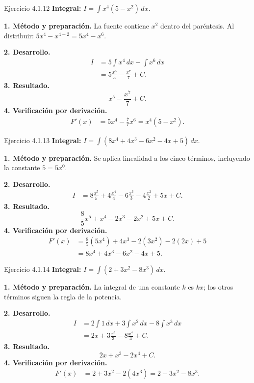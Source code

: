 \begin{examplebox}{Ejercicio 4.1.12}
\textbf{Integral:} $\displaystyle I=\int x^4(5-x^2)\,dx$.

\textbf{1. Método y preparación.} La fuente contiene $x^2$ dentro del paréntesis. Al distribuir: $5x^4-x^{4+2}=5x^4-x^6$.

\textbf{2. Desarrollo.}
\begin{align*}
I&=5\int x^4\,dx-\int x^6\,dx\\&=5\frac{x^5}{5}-\frac{x^7}{7}+C.
\end{align*}
\textbf{3. Resultado.}
\[
x^5-\frac{x^7}{7}+C.
\]
\textbf{4. Verificación por derivación.}
\begin{align*}
F'(x)&=5x^4-\frac77x^6=x^4(5-x^2).
\end{align*}
\end{examplebox}

\begin{examplebox}{Ejercicio 4.1.13}
\textbf{Integral:} $\displaystyle I=\int (8x^4+4x^3-6x^2-4x+5)\,dx$.

\textbf{1. Método y preparación.} Se aplica linealidad a los cinco términos, incluyendo la constante $5=5x^0$.

\textbf{2. Desarrollo.}
\begin{align*}
I&=8\frac{x^5}{5}+4\frac{x^4}{4}-6\frac{x^3}{3}-4\frac{x^2}{2}+5x+C.
\end{align*}
\textbf{3. Resultado.}
\[
\frac85x^5+x^4-2x^3-2x^2+5x+C.
\]
\textbf{4. Verificación por derivación.}
\begin{align*}
F'(x)&=\frac85(5x^4)+4x^3-2(3x^2)-2(2x)+5\\&=8x^4+4x^3-6x^2-4x+5.
\end{align*}
\end{examplebox}

\begin{examplebox}{Ejercicio 4.1.14}
\textbf{Integral:} $\displaystyle I=\int (2+3x^2-8x^3)\,dx$.

\textbf{1. Método y preparación.} La integral de una constante $k$ es $kx$; los otros términos siguen la regla de la potencia.

\textbf{2. Desarrollo.}
\begin{align*}
I&=2\int1\,dx+3\int x^2\,dx-8\int x^3\,dx\\&=2x+3\frac{x^3}{3}-8\frac{x^4}{4}+C.
\end{align*}
\textbf{3. Resultado.}
\[
2x+x^3-2x^4+C.
\]
\textbf{4. Verificación por derivación.}
\begin{align*}
F'(x)&=2+3x^2-2(4x^3)=2+3x^2-8x^3.
\end{align*}
\end{examplebox}


